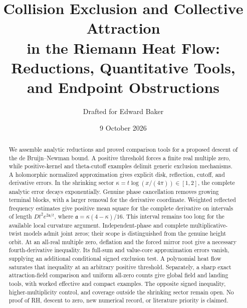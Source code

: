 \documentclass[11pt]{article}
\title{Collision Exclusion and Collective Attraction\protect\\
in the Riemann Heat Flow:\protect\\
Reductions, Quantitative Tools, and Endpoint Obstructions}
\author{Drafted for Edward Baker}
\date{9 October 2026}
\numberwithin{equation}{section}
\theoremstyle{definition}
\theoremstyle{remark}
\begin{document}
\maketitle
\begin{abstract}
We assemble analytic reductions and proved comparison tools for a proposed
descent of the de Bruijn--Newman bound. A positive threshold forces a finite
real multiple zero, while positive-kernel and theta-cutoff examples delimit
generic exclusion mechanisms. A holomorphic normalized approximation gives
explicit disk, reflection, cutoff, and derivative errors. In the shrinking
sector $\kappa=t\log(x/(4\pi))\in[1,2]$, the complete analytic error decays
exponentially. Genuine phase cancellation removes growing terminal blocks,
with a larger removal for the derivative coordinate. Weighted reflected
frequency estimates give positive mean square for the complete derivative
on intervals of length $Dt^2e^{2\mathfrak a/t}$, where
$\mathfrak a=\kappa(4-\kappa)/16$. This interval remains too long for
the available local curvature argument. Independent-phase and complete
multiplicative-twist models admit joint zeros; their scope is distinguished
from the genuine height orbit. At an all-real multiple zero, deflation and
the forced mirror root give a necessary fourth-derivative inequality.
Its full-sum and value-core approximation errors vanish, supplying an
additional conditional signed exclusion test. A polynomial heat flow
saturates that inequality at an arbitrary positive threshold. Separately,
a sharp exact attraction-field comparison and uniform all-zero counts
give global field and landing tools, with worked effective and compact
examples. The opposite signed inequality, higher-multiplicity control,
and coverage outside the shrinking sector remain open. No proof of RH,
descent to zero, new numerical record, or literature priority is claimed.
\end{abstract}
\tableofcontents
\end{document}
